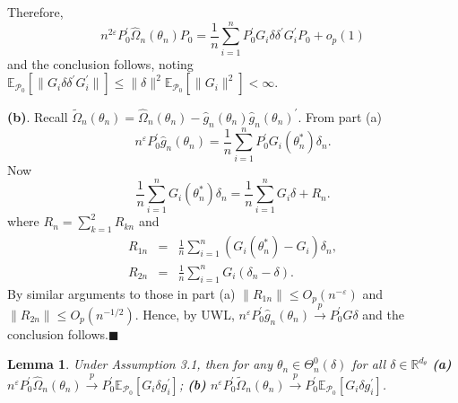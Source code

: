 \documentclass[hidelinks, 11 pt, a4paper, pdflatex]{article}
\newtheorem{lemma}{Lemma}[section]
\begin{document}
{  Therefore,
   \[
    n^{2\varepsilon }P_{0}^{\prime }\hat{\Omega}_{n}(\theta _{n})P_{0} = \frac{1}{n} \sum_{i=1}^{n} P_{0}^{\prime}G_{i}\delta \delta^{\prime}G_{i}^{\prime}P_{0} + o_{p}(1)
   \]
  and the conclusion follows, noting $\mathbb{E}_{\mathcal{P}_{0}}[\|G_{i}\delta \delta^{\prime }G_{i}^{\prime}\|] \leq \|\delta\|^{2} \mathbb{E}_{\mathcal{P}_{0}}[\|G_{i}\|^{2}] < \infty$.

  \textbf{(b)}. Recall $\tilde{\Omega}_{n}(\theta_{n}) = \hat{\Omega}_{n}(\theta_{n}) - \hat{g}_{n}(\theta_{n})\hat{g}_{n}(\theta_{n})^{\prime}$. From part (a)
   \[
    n^{\varepsilon}P_{0}^{\prime}\hat{g}_{n}(\theta_{n}) = \frac{1}{n} \sum_{i=1}^{n}
                                                            P_{0}^{\prime}G_{i}(\theta_{n}^{\ast})\delta _{n}.
   \]
  Now
   \[
    \frac{1}{n} \sum_{i=1}^{n} G_{i}(\theta_{n}^{\ast})\delta_{n} = \frac{1}{n} \sum_{i=1}^{n} G_{i}\delta + R_{n}.
   \]
  where $R_{n} = \sum_{k=1}^{2} R_{kn}$ and
   \begin{eqnarray*}
    R_{1n} & = & \frac{1}{n} \sum_{i=1}^{n} (G_{i}(\theta_{n}^{\ast}) - G_{i})\delta_{n}, \\
    R_{2n} & = & \frac{1}{n} \sum_{i=1}^{n} G_{i} (\delta_{n} - \delta ).
   \end{eqnarray*}%
  By similar arguments to those in part (a) $\|R_{1n}\| \leq O_{p}(n^{-\varepsilon })$ and $\|R_{2n}\| \leq O_{p}(n^{-1/2})$. Hence, by UWL, $n^{\varepsilon}P_{0}^{\prime}\hat{g}_{n}(\theta_{n}) \overset{p}{\rightarrow } P_{0}^{\prime}G\delta$ and the conclusion follows.$\blacksquare $

  \begin{lemma}
   Under Assumption 3.1, then for any $\theta_{n} \in \Theta_{n}^{0}(\delta)$ for all $\delta \in \mathbb{R}^{d_{\theta}}$
    \textbf{(a)} $n^{\varepsilon }P_{0}^{\prime}\hat{\Omega}_{n}(\theta_{n}) \overset{p}{\rightarrow} P_{0}^{\prime} \mathbb{E}_{\mathcal{P}_{0}}[G_{i}\delta g_{i}^{\prime}]$;
    \textbf{(b)} $n^{\varepsilon }P_{0}^{\prime}\tilde{\Omega}_{n}(\theta_{n}) \overset{p}{\rightarrow} P_{0}^{\prime} \mathbb{E}_{\mathcal{P}_{0}}[G_{i}\delta g_{i}^{\prime}]$.
  \end{lemma}

}
\end{document}
